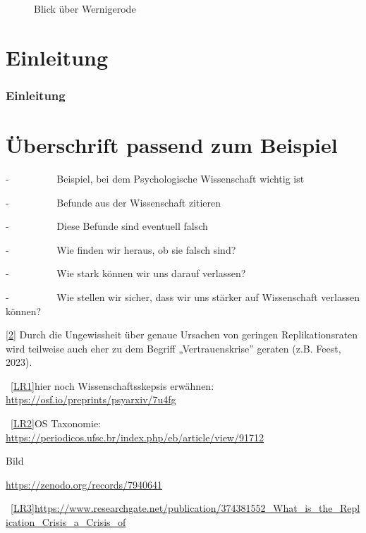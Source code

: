 \documentclass[
  letterpaper,
  DIV=11,
  numbers=noendperiod]{scrreprt}
\begin{document}
\begin{tcolorbox}
\begin{figure}[H]
{}

\caption{Blick über Wernigerode}

\end{figure}%

\end{tcolorbox}


\part{Einleitung}

\section*{Einleitung}\label{einleitung-1}


\part{Überschrift passend zum Beispiel}

-~~~~~~~~~ Beispiel, bei dem Psychologische Wissenschaft wichtig ist

-~~~~~~~~~ Befunde aus der Wissenschaft zitieren

-~~~~~~~~~ Diese Befunde sind eventuell falsch

-~~~~~~~~~ Wie finden wir heraus, ob sie falsch sind?

-~~~~~~~~~ Wie stark können wir uns darauf verlassen?

-~~~~~~~~~ Wie stellen wir sicher, dass wir uns stärker auf Wissenschaft
verlassen können?

\hyperref[_ftnref2]{{[}2{]}} Durch die Ungewissheit über genaue Ursachen
von geringen Replikationsraten wird teilweise auch eher zu dem Begriff
„Vertrauenskrise'' geraten (z.B. Feest, 2023).

~\hyperref[_msoanchor_1]{{[}LR1{]}}hier noch Wissenschaftsskepsis
erwähnen: \url{https://osf.io/preprints/psyarxiv/7u4fg} ~

~\hyperref[_msoanchor_2]{{[}LR2{]}}OS Taxonomie:
\url{https://periodicos.ufsc.br/index.php/eb/article/view/91712}

Bild

\url{https://zenodo.org/records/7940641}

~\hyperref[_msoanchor_3]{{[}LR3{]}}\url{https://www.researchgate.net/publication/374381552_What_is_the_Replication_Crisis_a_Crisis_of}
\end{document}
